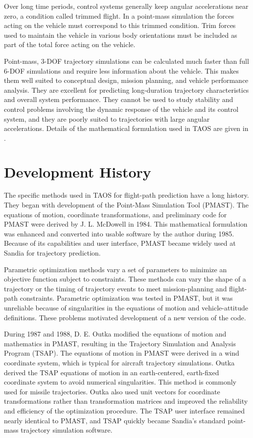 Over long time periods, control systems generally keep angular accelerations near
zero, a condition called trimmed flight. In a point-mass simulation the forces acting
on the vehicle must correspond to this trimmed condition. Trim forces used to
maintain the vehicle in various body orientations must be included as part of the total
force acting on the vehicle.

Point-mass, 3-DOF trajectory simulations can be calculated much faster than full
6-DOF simulations and require less information about the vehicle. This makes them
well suited to conceptual design, mission planning, and vehicle performance analysis.
They are excellent for predicting long-duration trajectory characteristics and overall
system performance. They cannot be used to study stability and control problems
involving the dynamic response of the vehicle and its control system, and they are
poorly suited to trajectories with large angular accelerations. Details of the
mathematical formulation used in TAOS are given in .

\section{Development History}\label{sec:development-history}

The specific methods used in TAOS for flight-path prediction have a long history.
They began with development of the Point-Mass Simulation Tool (PMAST). The
equations of motion, coordinate transformations, and preliminary code for PMAST
were derived by J. L. McDowell in 1984. This mathematical formulation was enhanced
and converted into usable software by the author during 1985. Because of its
capabilities and user interface, PMAST became widely used at Sandia for trajectory
prediction.

Parametric optimization methods vary a set of parameters to minimize an objective
function subject to constraints. These methods can vary the shape of a trajectory or
the timing of trajectory events to meet mission-planning and flight-path constraints.
Parametric optimization was tested in PMAST, but it was unreliable because of
singularities in the equations of motion and vehicle-attitude definitions. These
problems motivated development of a new version of the code.

During 1987 and 1988, D. E. Outka modified the equations of motion and mathematics
in PMAST, resulting in the Trajectory Simulation and Analysis Program (TSAP). The
equations of motion in PMAST were derived in a wind coordinate system, which is
typical for aircraft trajectory simulations. Outka derived the TSAP equations of
motion in an earth-centered, earth-fixed coordinate system to avoid numerical
singularities. This method is commonly used for missile trajectories. Outka also used
unit vectors for coordinate transformations rather than transformation matrices and
improved the reliability and efficiency of the optimization procedure. The TSAP user
interface remained nearly identical to PMAST, and TSAP quickly became Sandia's
standard point-mass trajectory simulation software.

